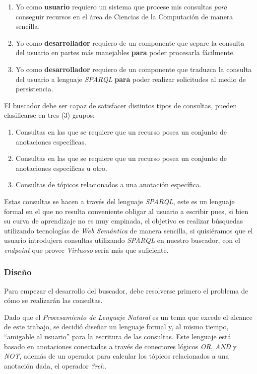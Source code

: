 \begin{itemize}
\begin{enumerate}
    \item Yo como \textbf{usuario} requiero un sistema que procese mis consultas \textit{para} conseguir recursos en el área de Ciencias de la Computación de manera sencilla.
    \item Yo como \textbf{desarrollador} requiero de un componente que separe la consulta del usuario en partes más manejables \textbf{para} poder procesarla fácilmente.
    \item Yo como \textbf{desarrollador} requiero de un componente que traduzca la consulta del usuario a lenguaje \textit{SPARQL} \textbf{para} poder realizar solicitudes al medio de persistencia.
\end{enumerate}

El buscador debe ser capaz de satisfacer distintos tipos de consultas, pueden clasificarse en tres (3) grupos:

\begin{enumerate}
    \item Consultas en las que se requiere que un recurso posea un conjunto de anotaciones específicas.
    \item Consultas en las que se requiere que un recurso posea un conjunto de anotaciones específicas u otro.
    \item Consultas de tópicos relacionados a una anotación específica.
\end{enumerate}

Estas consultas se hacen a través del lenguaje \textit{SPARQL}, este es un lenguaje formal en el que no resulta conveniente obligar al usuario a escribir pues, si bien su curva de aprendizaje no es muy empinada, el objetivo es realizar búsquedas utilizando tecnologías de \textit{Web Semántica} de manera sencilla, si quisiéramos que el usuario introdujera consultas utilizando \textit{SPARQL} en nuestro buscador, con el \textit{endpoint} que provee \textit{Virtuoso} sería más que suficiente.

\subsubsection{Diseño}
Para empezar el desarrollo del buscador, debe resolverse primero el problema de cómo se realizarán las consultas.

Dado que el \textit{Procesamiento de Lenguaje Natural} es un tema que excede el alcance de este trabajo, se decidió diseñar un lenguaje formal y, al mismo tiempo, ``amigable al usuario'' para la escritura de las consultas. Este lenguaje está basado en anotaciones conectadas a través de conectores lógicos \textit{OR}, \textit{AND} y \textit{NOT}, además de un operador para calcular los tópicos relacionados a una anotación dada, el operador \textit{?rel:}.


\end{itemize}
